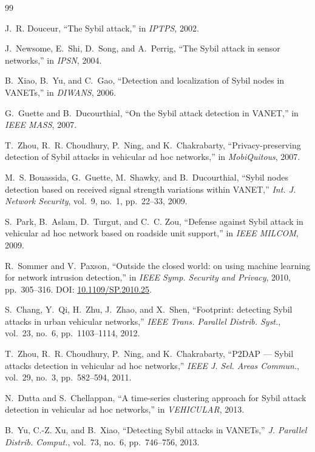 \documentclass[conference]{IEEEtran}
\begin{document}
\begin{thebibliography}{99}

 J.~R. Douceur, ``The Sybil attack,'' in \emph{IPTPS}, 2002.

 J.~Newsome, E.~Shi, D.~Song, and A.~Perrig, ``The Sybil attack in sensor networks,'' in \emph{IPSN}, 2004.

 B.~Xiao, B.~Yu, and C.~Gao, ``Detection and localization of Sybil nodes in VANETs,'' in \emph{DIWANS}, 2006.

 G.~Guette and B.~Ducourthial, ``On the Sybil attack detection in VANET,'' in \emph{IEEE MASS}, 2007.

 T.~Zhou, R.~R. Choudhury, P.~Ning, and K.~Chakrabarty, ``Privacy-preserving detection of Sybil attacks in vehicular ad hoc networks,'' in \emph{MobiQuitous}, 2007.

 M.~S. Bouassida, G.~Guette, M.~Shawky, and B.~Ducourthial, ``Sybil nodes detection based on received signal strength variations within VANET,'' \emph{Int. J. Network Security}, vol.~9, no.~1, pp.~22--33, 2009.

 S.~Park, B.~Aslam, D.~Turgut, and C.~C. Zou, ``Defense against Sybil attack in vehicular ad hoc network based on roadside unit support,'' in \emph{IEEE MILCOM}, 2009.

 R.~Sommer and V.~Paxson, ``Outside the closed world: on using machine learning for network intrusion detection,'' in \emph{IEEE Symp. Security and Privacy}, 2010, pp.~305--316. DOI: \url{10.1109/SP.2010.25}.

 S.~Chang, Y.~Qi, H.~Zhu, J.~Zhao, and X.~Shen, ``Footprint: detecting Sybil attacks in urban vehicular networks,'' \emph{IEEE Trans. Parallel Distrib. Syst.}, vol.~23, no.~6, pp.~1103--1114, 2012.

 T.~Zhou, R.~R. Choudhury, P.~Ning, and K.~Chakrabarty, ``P2DAP --- Sybil attacks detection in vehicular ad hoc networks,'' \emph{IEEE J. Sel. Areas Commun.}, vol.~29, no.~3, pp.~582--594, 2011.

 N.~Dutta and S.~Chellappan, ``A time-series clustering approach for Sybil attack detection in vehicular ad hoc networks,'' in \emph{VEHICULAR}, 2013.

 B.~Yu, C.-Z. Xu, and B.~Xiao, ``Detecting Sybil attacks in VANETs,'' \emph{J. Parallel Distrib. Comput.}, vol.~73, no.~6, pp.~746--756, 2013.


\end{thebibliography}
\end{document}
